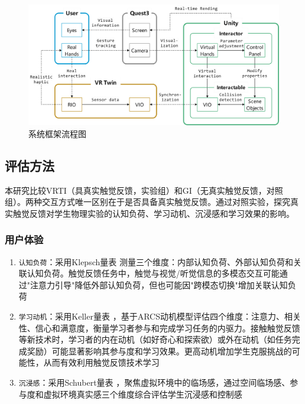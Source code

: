 \documentclass[runningheads]{llncs}
\begin{document}
\begin{figure}[t]
  \centering
  \includegraphics[width=1\textwidth]{image/system-framework-flowchart.pdf}
  \caption{系统框架流程图}
  \label{fig:system-framework-flowchart}
\end{figure}

\subsection{评估方法}
本研究比较VRTI（具真实触觉反馈，实验组）和GI（无真实触觉反馈，对照组）。两种交互方式唯一区别在于是否具备真实触觉反馈。通过对照实验，探究真实触觉反馈对学生物理实验的认知负荷、学习动机、沉浸感和学习效果的影响。

\subsubsection{用户体验}
\begin{enumerate}
  \item {\texttt{认知负荷}}：采用Klepsch量表 \cite{klepsch2017development} 测量三个维度：内部认知负荷、外部认知负荷和关联认知负荷。触觉反馈任务中，触觉与视觉/听觉信息的多模态交互可能通过"注意力引导"降低外部认知负荷，但也可能因"跨模态切换"增加关联认知负荷
  \item {\texttt{学习动机}}：采用Keller量表 \cite{keller1983motivational}，基于ARCS动机模型评估四个维度：注意力、相关性、信心和满意度，衡量学习者参与和完成学习任务的内驱力。接触触觉反馈等新技术时，学习者的内在动机（如好奇心和探索欲）或外在动机（如任务完成奖励）可能显著影响其参与度和学习效果。更高动机增加学生克服挑战的可能性，从而有效利用触觉反馈技术学习
  \item {\texttt{沉浸感}}：采用Schubert量表 \cite{schubert2001experience}，聚焦虚拟环境中的临场感，通过空间临场感、参与度和虚拟环境真实感三个维度综合评估学生沉浸感和控制感
\end{enumerate}
\end{document}

